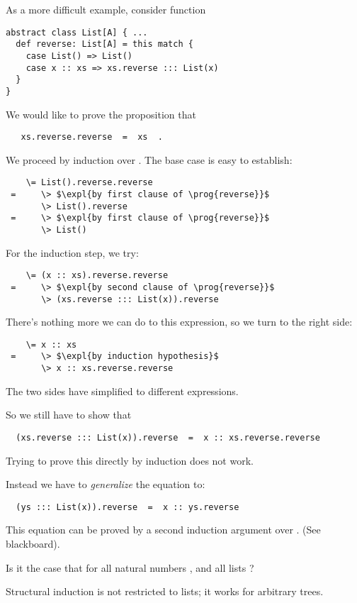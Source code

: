 {As a more difficult example, consider function
\begin{lstlisting}
abstract class List[A] { ...
  def reverse: List[A] = this match {
    case List() => List()
    case x :: xs => xs.reverse ::: List(x)
  }
}
\end{lstlisting}
We would like to prove the proposition that
\begin{lstlisting}
   xs.reverse.reverse  =  xs  .
\end{lstlisting}
We proceed by induction over . The base case is easy to establish:
\begin{lstlisting}
    \= List().reverse.reverse
 =     \> $\expl{by first clause of \prog{reverse}}$
       \> List().reverse
 =     \> $\expl{by first clause of \prog{reverse}}$
       \> List()
\end{lstlisting}
\es\bs
For the induction step, we try:
\begin{lstlisting}
    \= (x :: xs).reverse.reverse
 =     \> $\expl{by second clause of \prog{reverse}}$
       \> (xs.reverse ::: List(x)).reverse
\end{lstlisting}
There's nothing more we can do to this expression, so we turn to the right side:
\begin{lstlisting}
    \= x :: xs
 =     \> $\expl{by induction hypothesis}$
       \> x :: xs.reverse.reverse
\end{lstlisting}
The two sides have simplified to different expressions.

So we still have to show that
\begin{lstlisting}
  (xs.reverse ::: List(x)).reverse  =  x :: xs.reverse.reverse
\end{lstlisting}
Trying to prove this directly by induction does not work.

Instead we have to {\em generalize} the equation to:
\begin{lstlisting}
  (ys ::: List(x)).reverse  =  x :: ys.reverse
\end{lstlisting}
\es\bs
This equation can be proved by a second induction argument over .
(See blackboard).

\begin{exercise}
Is it the case that  for all 
natural numbers ,  and all lists ?
\end{exercise}

\es
{}

Structural induction is not restricted to lists; it works for arbitrary
trees.

}
